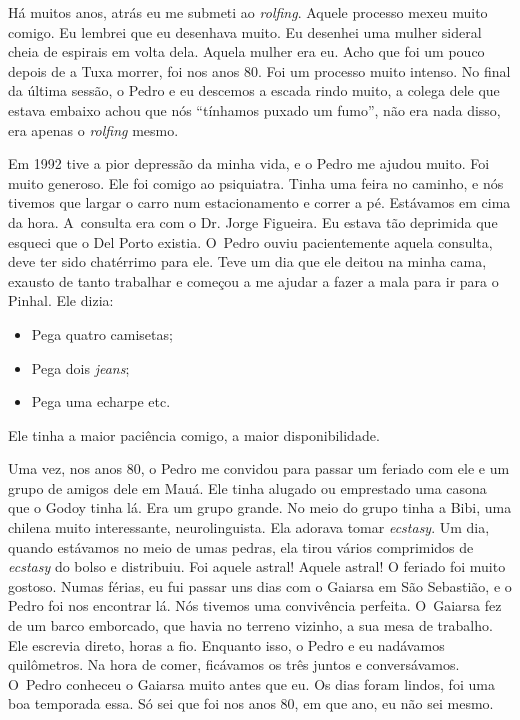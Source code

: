 Há muitos anos, atrás eu me submeti ao \emph{rolfing}. Aquele processo
mexeu muito comigo. Eu lembrei que eu desenhava muito. Eu desenhei uma
mulher sideral cheia de espirais em volta dela. Aquela mulher era eu.
Acho que foi um pouco depois de a Tuxa morrer, foi nos anos 80. Foi um
processo muito intenso. No final da última sessão, o Pedro e eu descemos
a escada rindo muito, a colega dele que estava embaixo achou que nós
``tínhamos puxado um fumo'', não era nada disso, era apenas o
\emph{rolfing} mesmo.

Em 1992 tive a pior depressão da minha vida, e o Pedro me ajudou muito.
Foi muito generoso. Ele foi comigo ao psiquiatra. Tinha uma feira no
caminho, e nós tivemos que largar o carro num estacionamento e correr a
pé. Estávamos em cima da hora. A~consulta era com o Dr. Jorge Figueira.
Eu estava tão deprimida que esqueci que o Del Porto existia. O~Pedro
ouviu pacientemente aquela consulta, deve ter sido chatérrimo para ele.
Teve um dia que ele deitou na minha cama, exausto de tanto trabalhar e
começou a me ajudar a fazer a mala para ir para o Pinhal. Ele dizia:

\begin{itemize}
\item
  Pega quatro camisetas;
\item
  Pega dois \emph{jeans};
\item
  Pega uma echarpe etc.
\end{itemize}
Ele tinha a maior paciência comigo, a maior disponibilidade.

Uma vez, nos anos 80, o Pedro me convidou para passar um feriado com ele
e um grupo de amigos dele em Mauá. Ele tinha alugado ou emprestado uma
casona que o Godoy tinha lá. Era um grupo grande. No meio do grupo tinha
a Bibi, uma chilena muito interessante, neurolinguista. Ela adorava
tomar \emph{ecstasy}. Um dia, quando estávamos no meio de umas pedras,
ela tirou vários comprimidos de \emph{ecstasy} do bolso e distribuiu.
Foi aquele astral! Aquele astral! O feriado foi muito gostoso. Numas
férias, eu fui passar uns dias com o Gaiarsa em São Sebastião, e o Pedro
foi nos encontrar lá. Nós tivemos uma convivência perfeita. O~Gaiarsa
fez de um barco emborcado, que havia no terreno vizinho, a sua mesa de
trabalho. Ele escrevia direto, horas a fio. Enquanto isso, o Pedro e eu
nadávamos quilômetros. Na hora de comer, ficávamos os três juntos e
conversávamos. O~Pedro conheceu o Gaiarsa muito antes que eu. Os dias
foram lindos, foi uma boa temporada essa. Só sei que foi nos anos 80, em
que ano, eu não sei mesmo.

